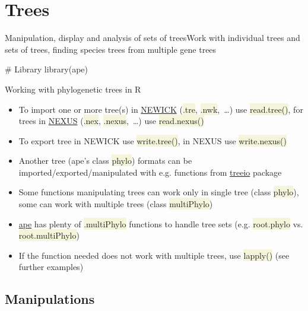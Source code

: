 \documentclass[compress, ucs, xelatex, 11pt, xcolor=svgnames, aspectratio=169,
	hyperref={
		bookmarks=true,
		unicode=true,
		colorlinks=true,
		pdftitle={Molecular data in R},
		plainpages=false,
		pdfauthor={Vojtech Zeisek},
		pdfsubject={Course about phylogeny and evolution in R},
		pdfcreator={XeLaTeX},
		pdfkeywords={R, evolution, phylogeny, molecular data},
		linkcolor=Crimson, %
		anchorcolor=Magenta, %
		citecolor=Magenta, %
		filecolor=Magenta, %
		menucolor=Magenta, %
		urlcolor=DodgerBlue, %
		pdftex},
	url={hyphens, lowtilde} %
	]{beamer}
\renewcommand{\texttt}[1]{\colorbox{Beige}{{\ttfamily #1}}}
\begin{document}
\section{Trees}

\begin{frame}[fragile]{Manipulation, display and analysis of sets of trees}{Work with individual trees and sets of trees, finding species trees from multiple gene trees}
	\tableofcontents[currentsection, sectionstyle=show/hide, hideothersubsections]
	\begin{spluscode}
    # Library
    library(ape)
	\end{spluscode}
\end{frame}

\begin{frame}{Working with phylogenetic trees in R}
	\begin{itemize}
		\item To import one or more tree(s) in \href{https://en.wikipedia.org/wiki/Newick_format}{NEWICK} (\texttt{*.tre}, \texttt{*.nwk},~\ldots) use \texttt{read.tree()}, for trees in \href{https://en.wikipedia.org/wiki/Nexus_file}{NEXUS} (\texttt{*.nex}, \texttt{*.nexus},~\ldots) use \texttt{read.nexus()}
		\item To export tree in NEWICK use \texttt{write.tree()}, in NEXUS use \texttt{write.nexus()}
		\item Another tree (ape's class \texttt{phylo}) formats can be imported/exported/manipulated with e.g. functions from \href{https://bioconductor.org/packages/release/bioc/html/treeio.html}{treeio} package
		\item Some functions manipulating trees can work only in single tree (class \texttt{phylo}), some can work with multiple trees (class \texttt{multiPhylo})
		\item \href{https://CRAN.R-project.org/package=ape}{ape} has plenty of \texttt{*.multiPhylo} functions to handle tree sets (e.g. \texttt{root.phylo} vs. \texttt{root.multiPhylo})
		\item If the function needed does not work with multiple trees, use \texttt{lapply()} (see further examples)
	\end{itemize}
\end{frame}

\subsection{Manipulations}
\end{document}
